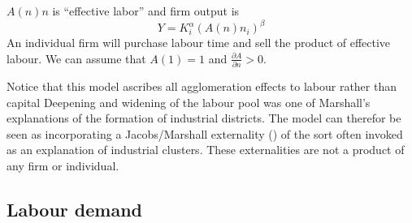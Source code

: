   $A(n)n$ is  ``effective labor'' and 
firm output is 
\begin{equation} 
Y=K_i^{\alpha }(A(n)n_i)^{\beta }
\label{eqn-solow-swan2}
\end{equation}
An individual firm will purchase labour time  and sell the product of effective labour. %
We can assume  that $A(1)=1$ and $\frac{\partial A}{\partial n}>0$. 

Notice that this model ascribes all agglomeration effects to labour rather than capital Deepening  and widening of the labour pool was one of Marshall's explanations of the formation of industrial districts. The model can therefor  be seen as incorporating a Jacobs/Marshall externality (\cite{Beaudry:2009ua, Panne:2004vb}) of the sort often invoked as an explanation of industrial clusters. These externalities  are not a product of any firm or individual. 





\subsection{Labour demand}\label{sec-labour-demand}


